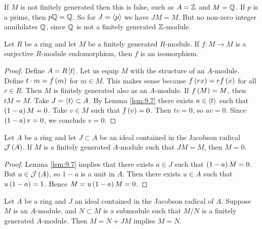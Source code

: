 
\begin{remark*}
If $ M $ is not finitely generated then this is false, such as $ A = \mathbb{Z} $ and $ M = \mathbb{Q} $. If $ p $ is a prime, then $ p\mathbb{Q} = \mathbb{Q} $. So for $ J = \left\langle p \right\rangle $ we have $ JM = M $. But no non-zero integer annihilates $ \mathbb{Q} $, since $ \mathbb{Q} $ is not a finitely generated $ \mathbb{Z} $-module.
\end{remark*}

\begin{corollary}
Let $ R $ be a ring and let $ M $ be a finitely generated $ R $-module. If $ f : M \to M $ is a surjective $ R $-module endomorphism, then $ f $ is an isomorphism.
\end{corollary}

\begin{proof}
Define $ A = R\sbr{t} $. Let us equip $ M $ with the structure of an $ A $-module. Define $ t \cdot m = f\br{m} $ for $ m \in M $. This makes sense because $ f\br{rx} = rf\br{x} $ for all $ r \in R $. Then $ M $ is finitely generated also as an $ A $-module. If $ f\br{M} = M $, then $ tM = M $. Take $ J = \left\langle t \right\rangle \subset A $. By Lemma \ref{lem:9.7} there exists $ a \in \left\langle t \right\rangle $ such that $ \br{1 - a}M = 0 $. Take $ v \in M $ such that $ f\br{v} = 0 $. Then $ tv = 0 $, so $ av = 0 $. Since $ \br{1 - a}v = 0 $, we conclude $ v = 0 $.
\end{proof}

\pagebreak

\begin{theorem}
Let $ A $ be a ring and let $ J \subset A $ be an ideal contained in the Jacobson radical $ \JJJ\br{A} $. If $ M $ is a finitely generated $ A $-module such that $ JM = M $, then $ M = 0 $.
\end{theorem}

\begin{proof}
Lemma \ref{lem:9.7} implies that there exists $ a \in J $ such that $ \br{1 - a}M = 0 $. But $ a \in \JJJ\br{A} $, so $ 1 - a $ is a unit in $ A $. Then there exists $ u \in A $ such that $ u\br{1 - a} = 1 $. Hence $ M = u\br{1 - a}M = 0 $.
\end{proof}

\begin{corollary}
\label{cor:9.10}
Let $ A $ be a ring and $ J $ an ideal contained in the Jacobson radical of $ A $. Suppose $ M $ is an $ A $-module, and $ N \subset M $ is a submodule such that $ M / N $ is a finitely generated $ A $-module. Then $ M = N + JM $ implies $ M = N $.
\end{corollary}

